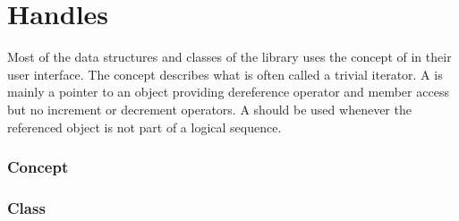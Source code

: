 \chapter{Handles} 

Most of the data structures and classes of the \cgal library
uses the concept of  in their user interface.
The concept  describes what is    often called 
a trivial iterator.  
A  is
mainly   a pointer to an object providing 
dereference operator  and 
member access  but no increment or decrement 
operators.
A   should be used whenever the referenced
object
is not part of a logical sequence.
 
\subsection*{Concept}

\subsection*{Class}
